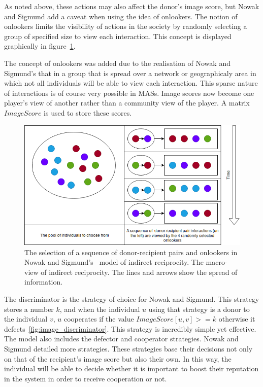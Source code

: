\documentclass[]{final_report}
\begin{document}
As noted above, these actions may also affect the donor's image score, but Nowak and Sigmund add a caveat when using the idea of onlookers. The notion of onlookers limits the visibility of actions in the society by randomly selecting a group of specified size to view each interaction. This concept is displayed graphically in figure~\ref{fig:onlookers}.\par 
The concept of onlookers was added due to the realisation of Nowak and Sigmund's that in a group that is spread over a network or geographicaly area in which not all individuals will be able to view each interaction. This sparse nature of interactions is of course very possible in MASs. Image scores now become one player's view of another rather than a community view of the player. A matrix $ImageScore$ is used to store these scores.\par
\begin{figure}
\begin{framed}
	\center
	\includegraphics[width=\textwidth]{Onlookers.png}
	\caption{The selection of a sequence of donor-recipient pairs and onlookers in Nowak and Sigmund's~\cite{evol_indirect_image} model of indirect reciprocity. The macro-view of indirect reciprocity. The lines and arrows show the spread of information.}
	\label{fig:onlookers}
\end{framed}
\end{figure}
The discriminator is the strategy of choice for Nowak and Sigmund. This strategy stores a number $k$, and when the individual $u$ using that strategy is a donor to the individual $v$, $u$ cooperates if the value $ImageScore[u,v]>=k$ otherwise it defects~\ref{fig:image_discriminator}. This strategy is incredibly simple yet effective. The model also includes the defector and cooperator strategies. Nowak and Sigmund detailed more strategies. These strategies base their decisions not only on that of the recipient's image score but also their own. In this way, the individual will be able to decide whether it is important to boost their reputation in the system in order to receive cooperation or not.\par
\end{document}
